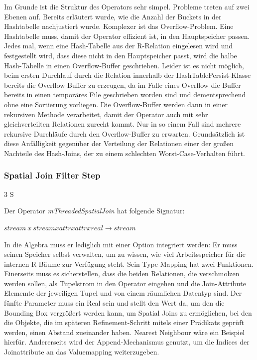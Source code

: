 \documentclass[a4paper,12pt,twoside]{article}
\newcommand{\Fb}[1]{\textit{#1}} %
\begin{document}
{Im Grunde ist die Struktur des Operators sehr simpel. Probleme treten auf zwei Ebenen auf. Bereits erläutert wurde, wie die Anzahl der Buckets in der Hashtabelle nachjustiert wurde. Komplexer ist das Overflow-Problem. Eine Hashtabelle muss, damit der Operator effizient ist, in den Hauptspeicher passen. Jedes mal, wenn eine Hash-Tabelle aus der R-Relation eingelesen wird und festgestellt wird, dass diese nicht in den Hauptspeicher passt, wird die halbe Hash-Tabelle in einen Overflow-Buffer geschrieben. Leider ist es nicht möglich, beim ersten Durchlauf durch die Relation innerhalb der HashTablePersist-Klasse bereits die Overflow-Buffer zu erzeugen, da im Falle eines Overflow die Buffer bereits in einen temporäres File geschrieben worden sind und dementsprechend ohne eine Sortierung vorliegen. Die Overflow-Buffer werden dann in einer rekursiven Methode verarbeitet, damit der Operator auch mit sehr gleichverteilten Relationen zurecht kommt. Nur in so einem Fall sind mehrere rekursive Durchläufe durch den Overflow-Buffer zu erwarten. Grundsätzlich ist diese Anfälligkeit gegenüber der Verteilung der Relationen einer der großen Nachteile des Hash-Joins, der zu einem schlechten Worst-Case-Verhalten führt.

\subsubsection{Spatial Join Filter Step} 3 S

Der Operator \Fb{mThreadedSpatialJoin} hat folgende Signatur:

$stream~x~stream x attr x attr x real \longrightarrow stream$

In die Algebra muss er lediglich mit einer Option integriert werden: Er muss seinen Speicher selbst verwalten, um zu wissen, wie viel Arbeitsspeicher für die internen R-Bäume zur Verfügung steht. Sein Type-Mapping hat zwei Funktionen. Einerseits muss es sicherstellen, dass die beiden Relationen, die verschmolzen werden sollen, als Tupelstrom in den Operator eingehen und die Join-Attribute Elememte der jeweiligen Tupel und von einem räumlichen Datentyp sind. Der fünfte Parameter muss ein Real sein und stellt den Wert da, um den die Bounding Box vergrößert werden kann, um Spatial Joins zu ermöglichen, bei den die Objekte, die im späteren Refinement-Schritt mitels einer Prädikats geprüft werden, einen Abstand zueinander haben. Nearest Neighbour wäre ein Beispiel hierfür. Andererseits wird der Append-Mechanismus genutzt, um die Indices der Joinattribute an das Valuemapping weiterzugeben.

}
\end{document}
